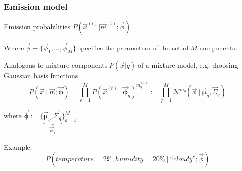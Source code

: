\subsubsection{Emission model}
\label{sec:hmm_emission}


\begin{frame}{\subsubsecname}

Emission probabilities $P(\vec x^{(t)} | \vec m^{(t)} ; \vec \phi)$

Where $\vec \phi = \{\vec \phi_1, \ldots, \vec \phi_M\}$ specifies the parameters of the set of $M$ components.

Analogous to mixture components $P(\vec x| q)$ of a mixture model, e.g. choosing Gaussian basis functions
\begin{equation}
P(\vec{x} ~|~ \vec{m}; \vec{\boldsymbol{\phi}}) = \prod_{q=1}^M
	P(\vec{x}^{(t)} ~|~ \vec{\boldsymbol{\phi}}_q)^{m_q^{(t)}} := \prod_{q=1}^M \mathcal{N}^{m_q} (\vec{x} ~|~ \vec{\boldsymbol{\mu}}_q, \vec{\Sigma}_q)
\end{equation}
				
where $\vec{\boldsymbol{\phi}} := \big\{\underbrace{\vec{\boldsymbol{\mu}}_q, \vec{\Sigma}_q}_{\vec{\boldsymbol{\phi}}_q} \big\}_{q=1}^M$

Example:\\
\begin{equation}
P(\mathit{temperature}=29^{\circ}, \mathit{humidity}=20\% ~|~ \text{``}\mathit{cloudy}\text{''}; \vec \phi)
\end{equation}

\end{frame}

